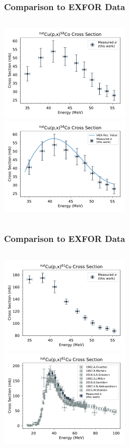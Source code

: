 \documentclass[12pt,xcolor=dvipsnames]{beamer}
\begin{document}
\begin{frame}
\frametitle{Comparison to EXFOR Data}
\begin{columns}[c]
\column{2.5in}
\includegraphics[width=2.5in]{cross_sections/58CO_only}
\\
\column{2.5in}
\includegraphics[width=2.5in]{cross_sections/58CO}
\\
\end{columns}
\end{frame}

\begin{frame}
\frametitle{Comparison to EXFOR Data}
\begin{columns}[c]
\column{2.5in}
\includegraphics[width=2.5in]{cross_sections/61CU_only}
\\
\column{2.5in}
\includegraphics[width=2.5in]{cross_sections/61CU}
\\
\end{columns}
\end{frame}
\end{document}
